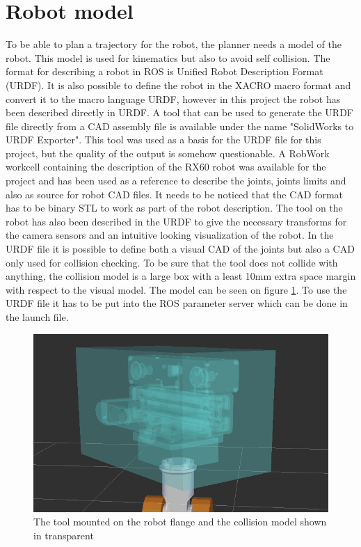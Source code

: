 \section{Robot model}
\label{sec:robot_model}
To be able to plan a trajectory for the robot, the planner needs a model of the robot. This model is used for kinematics but also to avoid self collision. The format for describing a robot in ROS is Unified Robot Description Format (URDF). It is also possible to define the robot in the XACRO macro format and convert it to the macro language URDF, however in this project the robot has been described directly in URDF.
A tool that can be used to generate the URDF file directly from a CAD assembly file is available under the name "SolidWorks to URDF Exporter". This tool was used as a basis for the URDF file for this project, but the quality of the output is somehow questionable. A RobWork workcell containing the description of the RX60 robot was available for the project and has been used as a reference to describe the joints, joints limits and also as source for robot CAD files. It needs to be noticed that the CAD format has to be binary STL to work as part of the robot description. The tool on the robot has also been described in the URDF to give the necessary transforms for the camera sensors and an intuitive looking visualization of the robot. In the URDF file it is possible to define both a visual CAD of the joints but also a CAD only used for collision checking. To be sure that the tool does not collide with anything, the collision model is a large box with a least 10mm extra space margin with respect to the visual model. The model can be seen on figure \ref{fig:tool_collision_model}. To use the URDF file it has to be put into the ROS parameter server which can be done in the launch file.

\begin{figure}[htb]
	\begin{center}
		\includegraphics[scale=0.5,trim=0 0 0 0]{graphics/05_robotics/tool_collision_model.png}%
		\caption{The tool mounted on the robot flange and the collision model shown in transparent}
		\label{fig:tool_collision_model}
	\end{center}
\end{figure}

